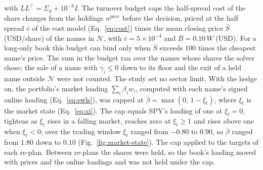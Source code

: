 with $L L^{\top} = \Sigma_g + 10^{-8} I$. The turnover budget caps the half-spread cost of the share changes from
the holdings $n^{\mathrm{prev}}$ before the decision, priced at the half spread $\bar c$ of the cost model
(Eq.~\ref{eq:cost}) times the mean closing price $\bar S$ (USD/share) of the names in $\mathcal{N}$, with
$\bar c = 5 \times 10^{-4}$ and $B = 0.10\,W$ (USD). For a long-only book this budget can bind only when $\bar S$
exceeds $100$ times the cheapest name's price. The sum in the budget ran over the names whose shares the solver
chose; the sale of a name with $\gamma_i \le 0$ down to its floor and the exit of a held name outside $\mathcal{N}$
were not counted.
The study set no sector limit. With the hedge on, the portfolio's market loading $\sum_i \beta_i w_i$, computed with
each name's signed online loading (Eq.~\ref{eq:ewls}), was capped at
$\bar\beta = \max(0,\, 1 - \xi_t)$, where $\xi_t$ is the market state (Eq.~\ref{eq:xi}). The cap equals SPY's loading
of one at $\xi_t = 0$, tightens as $\xi_t$ rises in a falling market, reaches zero at $\xi_t \ge 1$ and rises above
one when $\xi_t < 0$; over the trading window $\xi_t$ ranged from $-0.80$ to $0.90$, so $\bar\beta$ ranged from
$1.80$ down to $0.10$ (Fig.~\ref{fig:market-state}). The cap applied to the targets of each re-plan. Between
re-plans the shares were held, so the book's loading moved with prices and the online loadings and was not held
under the cap.

